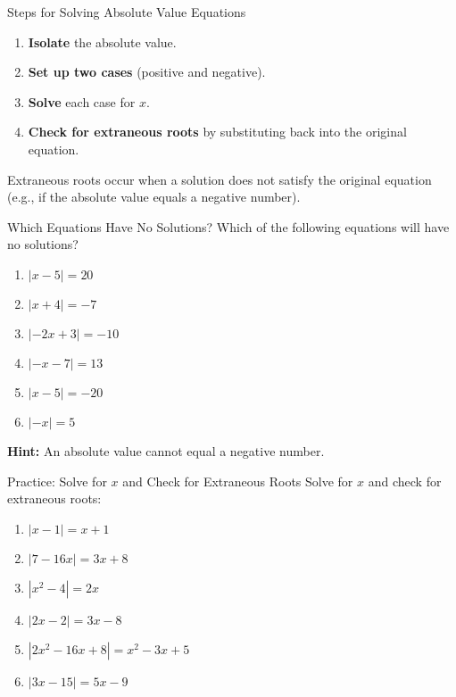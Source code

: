 \documentclass[aspectratio=169]{beamer}
\begin{document}
\begin{frame}{Steps for Solving Absolute Value Equations}
    \begin{tcolorbox}[colback=lightgray,colframe=primary,title=Steps]
        \footnotesize
        \begin{enumerate}
            \item \textbf{Isolate} the absolute value.
            \item \textbf{Set up two cases} (positive and negative).
            \item \textbf{Solve} each case for $x$.
            \item \textbf{Check for extraneous roots} by substituting back into the original equation.
        \end{enumerate}
        Extraneous roots occur when a solution does not satisfy the original equation (e.g., if the absolute value equals a negative number).
    \end{tcolorbox}
\end{frame}

\begin{frame}{Which Equations Have No Solutions?}
    \footnotesize
    Which of the following equations will have no solutions?\\[0.5em]
    \begin{enumerate}[label=6.3.\alph*)]
        \item $|x-5|=20$
        \item $|x+4|=-7$
        \item $|-2x+3|=-10$
        \item $|-x-7|=13$
        \item $|x-5|=-20$
        \item $|-x|=5$
    \end{enumerate}
    \vspace{1em}
    \textbf{Hint:} An absolute value cannot equal a negative number.
\end{frame}

\begin{frame}{Practice: Solve for $x$ and Check for Extraneous Roots}
    \footnotesize
    Solve for $x$ and check for extraneous roots:
    \begin{enumerate}[label=Q\arabic*]
        \item $|x-1| = x+1$
        \item $|7-16x| = 3x+8$
        \item $|x^2-4| = 2x$
        \item $|2x-2| = 3x-8$
        \item $|2x^2-16x+8| = x^2-3x+5$
        \item $|3x-15| = 5x-9$
    \end{enumerate}
\end{frame}
\end{document}
